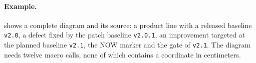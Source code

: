 \paragraph{Example.}
 shows a complete diagram and its source: a
product line with a released baseline \texttt{v2.0}, a defect fixed by the
patch baseline \texttt{v2.0.1}, an improvement targeted at the planned
baseline \texttt{v2.1}, the NOW marker and the gate of \texttt{v2.1}. The
diagram needs twelve macro calls, none of which contains a coordinate in
centimeters.

